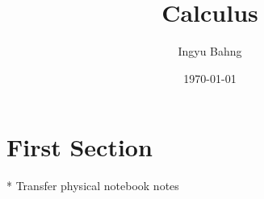 \documentclass[10pt]{article}
\title{Calculus}
\date{\today}
\author{Ingyu Bahng}
\begin{document}


\section{First Section}

* Transfer physical notebook notes
  
\end{document}
